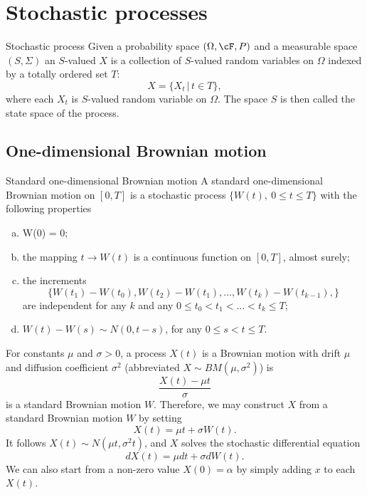 \section{Stochastic processes}

\begin{defn}{Stochastic process}
Given a probability space $(\Omega, \cF, P)$ and a measurable space
$(S, \Sigma)$ an $S$-valued  $X$ is a collection of $S$-valued random variables on $\Omega$ indexed by a totally ordered set $T$:
\[
X = \lbrace X_t\,|\, t \in T\rbrace,
\]
where each $X_t$ is $S$-valued random variable on $\Omega$.
The space $S$ is then called the state space of the process.
\end{defn}

\subsection{One-dimensional Brownian motion}

\begin{defn}{Standard one-dimensional Brownian motion}
A standard one-dimensional Brownian motion on $[0,T]$ is a stochastic
process $\lbrace W(t),\ 0 \leq t \leq T \rbrace$ with the following properties
\begin{enumerate}[(a)]
\item
 W(0) = 0;
\item
 the mapping $t \rightarrow W(t)$ is a continuous function on $[0,T]$, almost surely;
\item
 the increments
\[
 \lbrace W(t_1) - W(t_0), W(t_2) - W(t_1),\ldots, W(t_k) - W(t_{k-1}), \rbrace
\]
are independent for any $k$ and any $0 \leq t_0 < t_1 < \ldots < t_k \leq T$;
\item
 $W(t)-W(s) \sim N(0, t-s)$, for any $0 \leq s < t \leq T$.
\end{enumerate}
\end{defn}

For constants $\mu$ and $\sigma > 0$, a process $X(t)$ is a Brownian motion
with drift $\mu$ and diffusion coefficient $\sigma^2$ (abbreviated
$X \sim BM(\mu, \sigma^2)$) is
\[
\frac{X(t)-\mu t}{\sigma}
\]
is a standard Brownian motion $W$.
Therefore, we may construct $X$ from a standard Brownian motion $W$ by setting
\[
 X(t) = \mu t + \sigma W(t).
\]
It follows $X(t) \sim N(\mu t, \sigma^2 t)$, and $X$ solves the stochastic
differential equation 
\[
 dX(t) = \mu dt + \sigma dW(t).
\]
We can also start from a non-zero value $X(0) = \alpha$ by simply adding $x$
to each $X(t)$.

